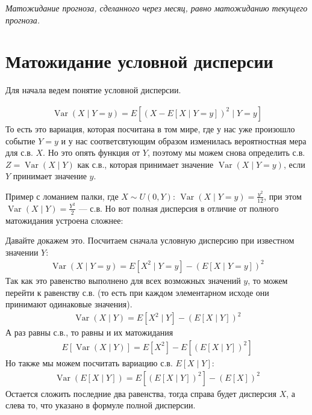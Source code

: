 \documentclass[12pt]{article}
\DeclareMathOperator{\Var}{Var}
\begin{document}
\begin{center}
  \begin{minipage}{0.8\textwidth}
      \textit{Матожидание прогноза, сделанного через месяц, равно матожиданию текущего прогноза.}
  \end{minipage}
\end{center}

\section{Матожидание условной дисперсии}

Для начала ведем понятие условной дисперсии.

\begin{align*}
  \Var(X \mid Y = y) = E\left[(X - E[X \mid Y = y])^2 \mid Y = y\right]
\end{align*}
То есть это вариация, которая посчитана в том мире, где у нас уже произошло событие $Y = y$ и у нас соответсвтующим образом изменилась вероятностная мера для с.в. $X$. Но это опять функция от $Y$, поэтому мы можем снова определить с.в. $Z = \Var(X \mid Y)$ как с.в., которая принимает значение $\Var(X \mid Y = y)$, если $Y$ принимает значение $y$.

Пример с ломанием палки, где $X \sim U(0, Y)$: $\Var(X \mid Y = y) = \frac{y^2}{12}$, при этом $\Var(X \mid Y) = \frac{Y^2}{2}$ --- с.в. Но вот полная дисперсия в отличие от полного матожидания устроена сложнее:

\begin{center}
\end{center}

Давайте докажем это. Посчитаем сначала условную дисперсию при известном значении $Y$:
\begin{align*}
  \Var(X \mid Y = y) = E[X^2 \mid Y = y] - (E[X \mid Y = y])^2
\end{align*}
Так как это равенство выполнено для всех возможных значений $y$, то можем перейти к равенству с.в. (то есть при каждом элементарном исходе они принимают одинаковые значения).
\begin{align*}
  \Var(X \mid Y) = E[X^2 \mid Y] - (E[X \mid Y])^2
\end{align*}
А раз равны с.в., то равны и их матожидания
\begin{align*}
  E[\Var(X \mid Y)] = E[X^2] - E[(E[X \mid Y])^2]
\end{align*}
Но также мы можем посчитать вариацию с.в. $E[X \mid Y]$:
\begin{align*}
  \Var(E[X \mid Y]) = E[(E[X \mid Y])^2] - (E[X])^2
\end{align*}
Остается сложить последние два равенства, тогда справа будет дисперсия $X$, а слева то, что указано в формуле полной дисперсии.
\end{document}

